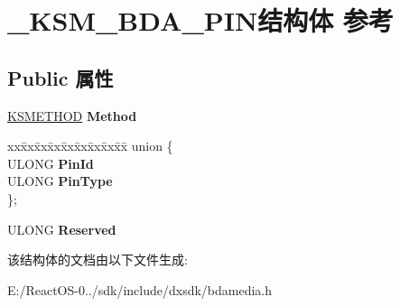 \hypertarget{struct___k_s_m___b_d_a___p_i_n}{}\section{\+\_\+\+K\+S\+M\+\_\+\+B\+D\+A\+\_\+\+P\+I\+N结构体 参考}
\label{struct___k_s_m___b_d_a___p_i_n}
\subsection*{Public 属性}
\begin{DoxyCompactItemize}
\item 
\mbox{\label{struct___k_s_m___b_d_a___p_i_n_a4a492e8e44e2843a211ecd4e0e88296c}} 
\hyperlink{struct_k_s_i_d_e_n_t_i_f_i_e_r}{K\+S\+M\+E\+T\+H\+OD} {\bfseries Method}
\item 
\mbox{\label{struct___k_s_m___b_d_a___p_i_n_a1611e3f97929ed5eb1824169324d8c4e}} 
\begin{tabbing}
xx\=xx\=xx\=xx\=xx\=xx\=xx\=xx\=xx\=\kill
union \{\\
\>ULONG {\bfseries PinId}\\
\>ULONG {\bfseries PinType}\\
\}; \\

\end{tabbing}\item 
\mbox{\label{struct___k_s_m___b_d_a___p_i_n_aee4ff339de803d6e9e3f2626402e4d00}} 
U\+L\+O\+NG {\bfseries Reserved}
\end{DoxyCompactItemize}


该结构体的文档由以下文件生成\+:\begin{DoxyCompactItemize}
\item 
E\+:/\+React\+O\+S-\/0../sdk/include/dxsdk/bdamedia.\+h\end{DoxyCompactItemize}
